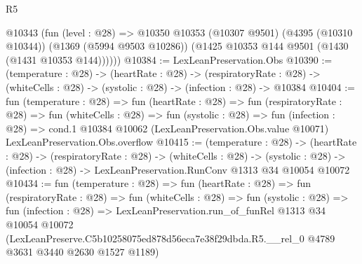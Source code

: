 \begin{lexlean}{R5}
\begin{coremodule}
      @10343
        (fun (level : @28) =>
        @10350
          @10353
          (@10307 @9501)
          (@4395 (@10310 @10344))
          (@1369 (@5994 @9503 @10286))
          (@1425 @10353 @144 @9501 (@1430 (@1431 @10353 @144))))))
@10384 := LexLeanPreservation.Obs
@10390 := (temperature : @28) ->
  (heartRate : @28) ->
  (respiratoryRate : @28) -> (whiteCells : @28) -> (systolic : @28) -> (infection : @28) -> @10384
@10404 := fun (temperature : @28) =>
  fun (heartRate : @28) =>
  fun (respiratoryRate : @28) =>
  fun (whiteCells : @28) =>
  fun (systolic : @28) =>
  fun (infection : @28) =>
  cond.{1} @10384 @10062 (LexLeanPreservation.Obs.value @10071) LexLeanPreservation.Obs.overflow
@10415 := (temperature : @28) ->
  (heartRate : @28) ->
  (respiratoryRate : @28) ->
  (whiteCells : @28) ->
  (systolic : @28) -> (infection : @28) -> LexLeanPreservation.RunConv @1313 @34 @10054 @10072
@10434 := fun (temperature : @28) =>
  fun (heartRate : @28) =>
  fun (respiratoryRate : @28) =>
  fun (whiteCells : @28) =>
  fun (systolic : @28) =>
  fun (infection : @28) =>
  LexLeanPreservation.run_of_funRel
    @1313
    @34
    @10054
    @10072
    (LexLeanPreserve.C5b10258075ed878d56eca7e38f29dbda.R5.__rel_0
      @4789
      @3631
      @3440
      @2630
      @1527
      @1189)
\end{coremodule}
\end{lexlean}
